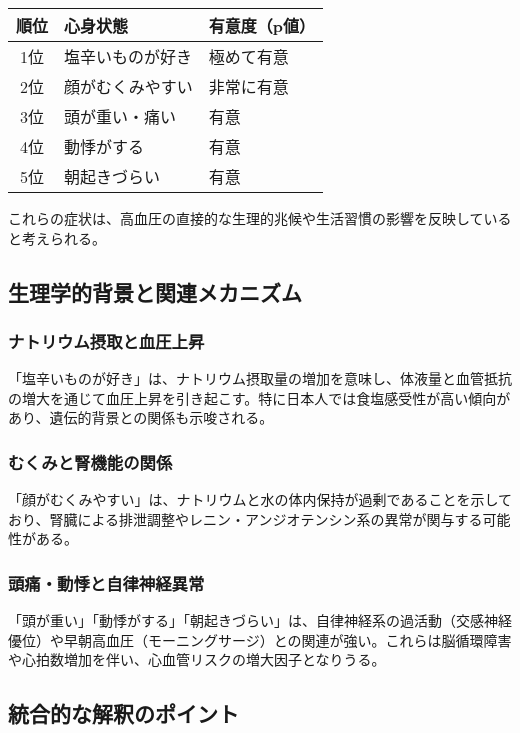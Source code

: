 \documentclass[a4paper,12pt]{article}
\begin{document}
\begin{table}[H]
\centering
\begin{tabular}{|c|l|l|}
\hline
順位 & 心身状態 & 有意度（p値） \\
\hline
1位 & 塩辛いものが好き & 極めて有意 \\
2位 & 顔がむくみやすい & 非常に有意 \\
3位 & 頭が重い・痛い & 有意 \\
4位 & 動悸がする & 有意 \\
5位 & 朝起きづらい & 有意 \\
\hline
\end{tabular}
\end{table}

これらの症状は、高血圧の直接的な生理的兆候や生活習慣の影響を反映していると考えられる。

\subsection*{生理学的背景と関連メカニズム}

\subsubsection*{ナトリウム摂取と血圧上昇}

「塩辛いものが好き」は、ナトリウム摂取量の増加を意味し、体液量と血管抵抗の増大を通じて血圧上昇を引き起こす。特に日本人では食塩感受性が高い傾向があり、遺伝的背景との関係も示唆される。

\subsubsection*{むくみと腎機能の関係}

「顔がむくみやすい」は、ナトリウムと水の体内保持が過剰であることを示しており、腎臓による排泄調整やレニン・アンジオテンシン系の異常が関与する可能性がある。

\subsubsection*{頭痛・動悸と自律神経異常}

「頭が重い」「動悸がする」「朝起きづらい」は、自律神経系の過活動（交感神経優位）や早朝高血圧（モーニングサージ）との関連が強い。これらは脳循環障害や心拍数増加を伴い、心血管リスクの増大因子となりうる。

\subsection*{統合的な解釈のポイント}
\end{document}
